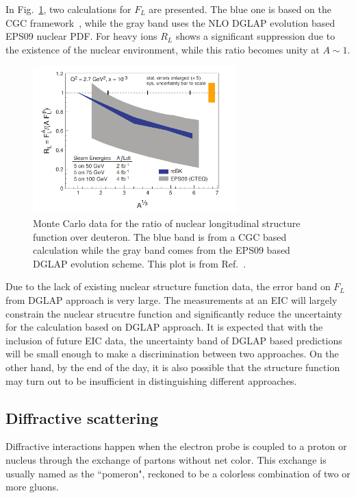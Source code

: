 In Fig.~\ref{fig:F_L}, two calculations for $F_L$ are presented. The blue one is
based on the CGC framework~\cite{Albacete:2009fh}, while the gray band uses the
NLO DGLAP evolution based EPS09 nuclear PDF. For heavy ions $R_L$ shows a
significant suppression due to the existence of the nuclear environment,
while this ratio becomes unity at $A\sim 1$. 
\begin{figure}
\centering
\includegraphics[width=0.7\textwidth]{plots/chpt3/FL_WP.png}
\caption[Longitudinal structure function ratio of different nuclear types over deuteron]{
Monte Carlo data for the ratio of nuclear longitudinal structure function over deuteron. The blue band is from a CGC based calculation while the gray band comes from the EPS09 based DGLAP evolution scheme. This plot is from Ref.~\cite{Accardi:2012qut}.}
\label{fig:F_L}
\end{figure}
Due to the lack of existing nuclear structure function data, the error band on $F_L$ from 
DGLAP approach is very large. The measurements at an EIC will largely constrain the nuclear strucutre
function and significantly reduce the uncertainty for the calculation based on DGLAP approach.
It is expected that with the inclusion of future EIC data, the uncertainty band of DGLAP based
predictions will be small enough to make a discrimination between two approaches.
On the other hand, by the end of the day, it is also possible that the structure function may turn out to be insufficient 
in distinguishing different approaches.


\subsection{Diffractive scattering}
Diffractive interactions happen when the electron probe is coupled to a proton
or nucleus through the exchange of partons without net color. This exchange is
usually named as the ``pomeron", reckoned to be a colorless combination of two or
more gluons.

